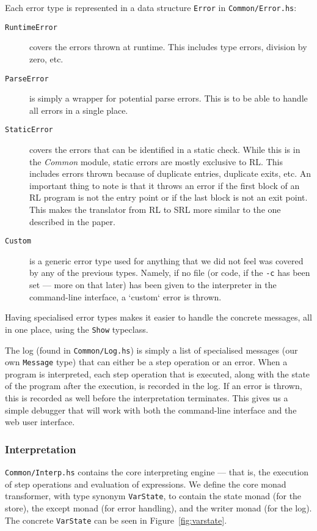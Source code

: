 Each error type is represented in a data structure \texttt{Error} in \texttt{Common/Error.hs}:
\begin{description}
  \item[\texttt{RuntimeError}] covers the errors thrown at runtime. This includes type errors, division by zero, etc.
  \item[\texttt{ParseError}] is simply a wrapper for potential parse errors. This is to be able to handle all errors in a single place.
  \item[\texttt{StaticError}] covers the errors that can be identified in a static check. While this is in the \textit{Common} module, static errors are mostly exclusive to RL. This includes errors thrown because of duplicate entries, duplicate exits, etc. An important thing to note is that it throws an error if the first block of an RL program is not the entry point or if the last block is not an exit point. This makes the translator from RL to SRL more similar to the one described in the paper.
  \item[\texttt{Custom}] is a generic error type used for anything that we did not feel was covered by any of the previous types. Namely, if no file (or code, if the \texttt{-c} has been set --- more on that later) has been given to the interpreter in the command-line interface, a `custom` error is thrown.
\end{description}

Having specialised error types makes it easier to handle the concrete messages, all in one place, using the \texttt{Show} typeclass.

The log (found in \texttt{Common/Log.hs}) is simply a list of specialised messages (our own \texttt{Message} type) that can either be a step operation or an error. When a program is interpreted, each step operation that is executed, along with the state of the program after the execution, is recorded in the log. If an error is thrown, this is recorded as well before the interpretation terminates. This gives us a simple debugger that will work with both the command-line interface and the web user interface.

\subsubsection{Interpretation}
\texttt{Common/Interp.hs} contains the core interpreting engine --- that is, the execution of step operations and evaluation of expressions. We define the core monad transformer, with type synonym \texttt{VarState}, to contain the state monad (for the store), the except monad (for error handling), and the writer monad (for the log). The concrete \texttt{VarState} can be seen in Figure~\ref{fig:varstate}.

